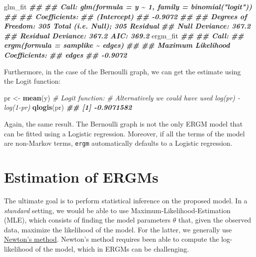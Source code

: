 \documentclass[
]{book}
\newenvironment{Shaded}{\begin{snugshade}}{\end{snugshade}}
\newcommand{\CommentTok}[1]{\textcolor[rgb]{0.56,0.35,0.01}{\textit{#1}}}
\newcommand{\DocumentationTok}[1]{\textcolor[rgb]{0.56,0.35,0.01}{\textbf{\textit{#1}}}}
\newcommand{\FunctionTok}[1]{\textcolor[rgb]{0.13,0.29,0.53}{\textbf{#1}}}
\newcommand{\NormalTok}[1]{#1}
\newcommand{\OtherTok}[1]{\textcolor[rgb]{0.56,0.35,0.01}{#1}}
\begin{document}
\begin{Shaded}
\begin{Highlighting}[]
\NormalTok{glm\_fit}
\DocumentationTok{\#\# }
\DocumentationTok{\#\# Call:  glm(formula = y \textasciitilde{} 1, family = binomial("logit"))}
\DocumentationTok{\#\# }
\DocumentationTok{\#\# Coefficients:}
\DocumentationTok{\#\# (Intercept)  }
\DocumentationTok{\#\#     {-}0.9072  }
\DocumentationTok{\#\# }
\DocumentationTok{\#\# Degrees of Freedom: 305 Total (i.e. Null);  305 Residual}
\DocumentationTok{\#\# Null Deviance:       367.2 }
\DocumentationTok{\#\# Residual Deviance: 367.2     AIC: 369.2}
\NormalTok{ergm\_fit}
\DocumentationTok{\#\# }
\DocumentationTok{\#\# Call:}
\DocumentationTok{\#\# ergm(formula = samplike \textasciitilde{} edges)}
\DocumentationTok{\#\# }
\DocumentationTok{\#\# Maximum Likelihood Coefficients:}
\DocumentationTok{\#\#   edges  }
\DocumentationTok{\#\# {-}0.9072}
\end{Highlighting}
\end{Shaded}

Furthermore, in the case of the Bernoulli graph, we can get the estimate using the Logit function:

\begin{Shaded}
\begin{Highlighting}[]
\NormalTok{pr }\OtherTok{\textless{}{-}} \FunctionTok{mean}\NormalTok{(y)}
\CommentTok{\# Logit function:}
\CommentTok{\# Alternatively we could have used log(pr) {-} log(1{-}pr)}
\FunctionTok{qlogis}\NormalTok{(pr)}
\DocumentationTok{\#\# [1] {-}0.9071582}
\end{Highlighting}
\end{Shaded}

Again, the same result. The Bernoulli graph is not the only ERGM model that can be fitted using a Logistic regression. Moreover, if all the terms of the model are non-Markov terms, \texttt{ergm} automatically defaults to a Logistic regression.

\hypertarget{estimation-of-ergms}{%
\section{Estimation of ERGMs}\label{estimation-of-ergms}}

The ultimate goal is to perform statistical inference on the proposed model. In a \emph{standard} setting, we would be able to use Maximum-Likelihood-Estimation (MLE), which consists of finding the model parameters \(\theta\) that, given the observed data, maximize the likelihood of the model. For the latter, we generally use \href{https://en.wikipedia.org/wiki/Newton\%27s_method_in_optimization}{Newton's method}. Newton's method requires been able to compute the log-likelihood of the model, which in ERGMs can be challenging.
\end{document}
